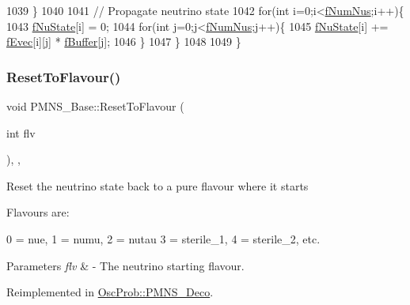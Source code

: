 \begin{DoxyCode}
1039   \}
1040 
1041   \textcolor{comment}{// Propagate neutrino state}
1042   \textcolor{keywordflow}{for}(\textcolor{keywordtype}{int} i=0;i<\hyperlink{classOscProb_1_1PMNS__Base_a24bb74bed63569dfe88b18fa6a08060e}{fNumNus};i++)\{
1043     \hyperlink{classOscProb_1_1PMNS__Base_abf99f2339e3ee989600740b5d88063e8}{fNuState}[i] = 0;
1044     \textcolor{keywordflow}{for}(\textcolor{keywordtype}{int} j=0;j<\hyperlink{classOscProb_1_1PMNS__Base_a24bb74bed63569dfe88b18fa6a08060e}{fNumNus};j++)\{
1045       \hyperlink{classOscProb_1_1PMNS__Base_abf99f2339e3ee989600740b5d88063e8}{fNuState}[i] +=  \hyperlink{classOscProb_1_1PMNS__Base_a87be137356c5f27ab83cab5e1298ef8f}{fEvec}[i][j] * \hyperlink{classOscProb_1_1PMNS__Base_a5440bc3efa466a37649601abce559e3e}{fBuffer}[j];
1046     \}
1047   \}
1048 
1049 \}
\end{DoxyCode}
\mbox{\label{classOscProb_1_1PMNS__Base_ac0d4bf8ff1318ef96d3dafa62e0cec25}} 
\subsubsection{\texorpdfstring{Reset\+To\+Flavour()}{ResetToFlavour()}}
{\footnotesize\ttfamily void P\+M\+N\+S\+\_\+\+Base\+::\+Reset\+To\+Flavour (\begin{DoxyParamCaption}\item[{int}]{flv }\end{DoxyParamCaption})\hspace{0.3cm}{\ttfamily [protected]}, {\ttfamily [virtual]}, {\ttfamily [inherited]}}

Reset the neutrino state back to a pure flavour where it starts

Flavours are\+: 
\begin{DoxyPre}
  0 = nue, 1 = numu, 2 = nutau
  3 = sterile\_1, 4 = sterile\_2, etc.
\end{DoxyPre}
 
\begin{DoxyParams}{Parameters}
{\em flv} & -\/ The neutrino starting flavour. \\
\hline
\end{DoxyParams}


Reimplemented in \hyperlink{classOscProb_1_1PMNS__Deco_a393940f176614e3ffebeea40cfe78a62}{Osc\+Prob\+::\+P\+M\+N\+S\+\_\+\+Deco}.




